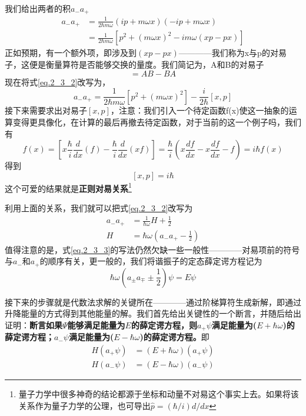 		我们给出两者的积$a_- a_+$
		\begin{equation}
		\label{eq.2_3_2}
			\begin{aligned}
			a_{-} a_{+} &=\frac{1}{2 \hbar m \omega}(i p+m \omega x)(-i p+m \omega x) \\
			&=\frac{1}{2 \hbar m \omega}\left[p^{2}+(m \omega x)^{2}-i m \omega(x p-p x)\right]
			\end{aligned}
		\end{equation}
		正如预期，有一个额外项，即涉及到$(xp-px)$————我们称为x与p的对易子，这便是衡量算符是否能够交换的量度。我们简记为，A和B的对易子
		\begin{equation}
		[A,B]=AB-BA
		\end{equation}
		现在将式\ref{eq.2_3_2}改写为，
		\begin{equation}
			a_{-} a_{+}=\frac{1}{2 \hbar m \omega}\left[p^{2}+(m \omega x)^{2}\right]-\frac{i}{2 \hbar}[x, p]
		\end{equation}
		接下来需要求出对易子$[x,p]$，注意：我们引入一个待定函数f(x)使这一抽象的运算变得更具像化，在计算的最后再撤去待定函数，对于当前的这一个例子吗，我们有
		\begin{equation}
			[x, p] f(x)=\left[x \frac{\hbar}{i} \frac{d}{d x}(f)-\frac{\hbar}{i} \frac{d}{d x}(x f)\right]=\frac{\hbar}{i}\left(x \frac{d f}{d x}-x \frac{d f}{d x}-f\right)=i \hbar f(x)
		\end{equation}
		得到
		\begin{equation}
		\boxed{[x, p]=i \hbar}
		\end{equation}
		这个可爱的结果就是\textbf{正则对易关系}\footnote{量子力学中很多神奇的结论都源于坐标和动量不对易这个事实上去。如果将该关系作为量子力学的公理，也可导出$\hat{p}=(\hbar/i)d/dx$}

		利用上面的关系，我们就可以把式\ref{eq.2_3_2}改写为
		\begin{align}
		a_{-} a_{+}&=\frac{1}{\hbar \omega} H+\frac{1}{2} \\
		\label{eq.2_3_3} H&=\hbar \omega\left(a_{-} a_{+}-\frac{1}{2}\right)
		\end{align}
		值得注意的是，式\ref{eq.2_3_3}的写法仍然欠缺一些一般性————对易项前的符号与$a_-$和$a_+$的顺序有关，更一般的，我们将谐振子的定态薛定谔方程记为
		\begin{equation}
			\hbar \omega\left(a_{\pm} a_{\mp} \pm \frac{1}{2}\right) \psi=E \psi
		\end{equation}

		接下来的步骤就是代数法求解的关键所在————通过阶梯算符生成新解，即通过升降能量的方式得到其他能量的解。我们首先给出关键性的一个断言，并随后给出证明：\textbf{断言如果$\Psi$能够满足能量为$E$的薛定谔方程，则$a_+ \psi$满足能量为($E+\hbar \omega$)的薛定谔方程；$a_- \psi$满足能量为($E-\hbar \omega$)的薛定谔方程。}即
		\begin{equation}
			\begin{aligned}
			H\left(a_{+} \psi\right)&=(E+\hbar \omega)\left(a_{+} \psi\right) \\
			H\left(a_{-} \psi\right)&=(E-\hbar \omega)\left(a_{-} \psi\right)
			\end{aligned}	
		\end{equation}
		

